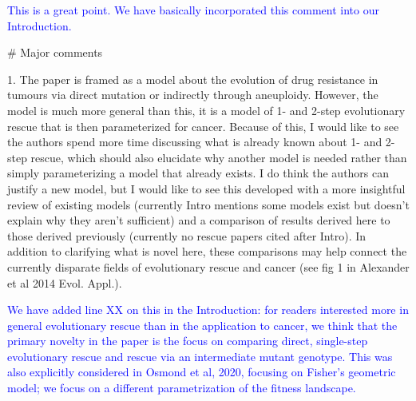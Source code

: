 \documentclass[12pt]{extarticle}
\begin{document}
\textcolor{blue}{This is a great point. We have basically incorporated this comment into our Introduction.}

$\#$ Major comments

1. The paper is framed as a model about the evolution of drug resistance in tumours via direct mutation or indirectly through aneuploidy. However, the model is much more general than this, it is a model of 1- and 2-step evolutionary rescue that is then parameterized for cancer. Because of this, I would like to see the authors spend more time discussing what is already known about 1- and 2-step rescue, which should also elucidate why another model is needed rather than simply parameterizing a model that already exists. I do think the authors can justify a new model, but I would like to see this developed with a more insightful review of existing models (currently Intro mentions some models exist but doesn't explain why they aren't sufficient) and a comparison of results derived here to those derived previously (currently no rescue papers cited after Intro). In addition to clarifying what is novel here, these comparisons may help connect the currently disparate fields of evolutionary rescue and cancer (see fig 1 in Alexander et al 2014 Evol. Appl.).

\textcolor{blue}{We have added line XX on this in the Introduction: for readers interested more in general evolutionary rescue than in the application to cancer, we think that the primary novelty in the paper is the focus on comparing direct, single-step evolutionary rescue and rescue via an intermediate mutant genotype.
This was also explicitly considered in Osmond et al, 2020, focusing on Fisher's geometric model;
we focus on a different parametrization of the fitness landscape.}
\end{document}
